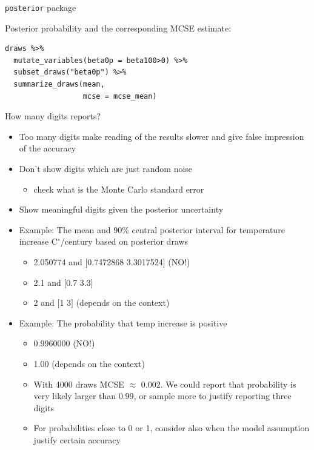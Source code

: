 \documentclass[english,t]{beamer}
\begin{document}
\begin{frame}[fragile]{\texttt{posterior} package}

  Posterior probability and the corresponding MCSE estimate:
\vspace{-.5\baselineskip}
  {\small
\begin{verbatim}
draws %>%
  mutate_variables(beta0p = beta100>0) %>%
  subset_draws("beta0p") %>%
  summarize_draws(mean,
                  mcse = mcse_mean)
\end{verbatim}
    }

  
\end{frame}

\begin{frame}{How many digits reports?}

\vspace{-0.5\baselineskip}  
  \begin{itemize}
  \item Too many digits make reading of the results slower and give
    false impression of the accuracy
  \item<2-> Don't show digits which are just random noise
    \begin{itemize}
    \item check what is the Monte Carlo standard error
    \end{itemize}
  \item<3-> Show meaningful digits given the posterior uncertainty
  \item<4-> Example: The mean and 90\% central posterior interval for temperature
     increase C$^\circ$/century based on posterior draws
     \begin{itemize}
     \item<5-> {\color{red} 2.050774 and $[$0.7472868 3.3017524$]$} (NO!)
     \item<6-> {\color{darkgreen} 2.1 and $[$0.7 3.3$]$}
    \item<7-> {\color{navyblue} 2 and $[$1 3$]$} (depends on the context)
     \end{itemize}
   \item<8-> Example: The probability that temp increase is
     positive
     \begin{itemize}
     \item<9-> {\color{red} 0.9960000} (NO!)
     \item<10-> {\color{navyblue} 1.00} (depends on the context)
     \item<11-> With 4000 draws MCSE $\approx$ 0.002. We could report
       that probability is {\color{darkgreen} very likely larger than 0.99}, or sample
       more to justify reporting three digits
     \item<12-> For probabilities close to 0 or 1, consider also when
       the model assumption justify certain accuracy
     \end{itemize}
  \end{itemize}


\end{frame}
\end{document}
